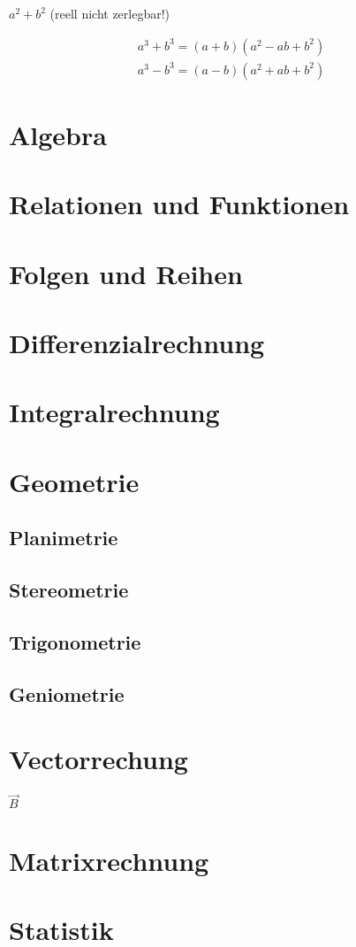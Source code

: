 \documentclass[8pt,a4paper,fleqn]{article}
\begin{document}
 
$a^ 2 + b^2 $ (reell nicht zerlegbar!) 

\begin{align*} 
a^ 3 + b^3 = (a+b)( a^ 2 - ab + b^2) \\
a^ 3 - b^3 = (a-b)( a^ 2 + ab + b^2)
\end{align*}


\section{Algebra}
\section{Relationen und Funktionen}
\section{Folgen und Reihen}
\section{Differenzialrechnung}
\section{Integralrechnung}
\section{Geometrie}
\subsection{Planimetrie}
\subsection{Stereometrie}
\subsection{Trigonometrie}
\subsection{Geniometrie}
\section{Vectorrechung}
$\vec{B}$
\section{Matrixrechnung}
\section{Statistik}
\end{document}
